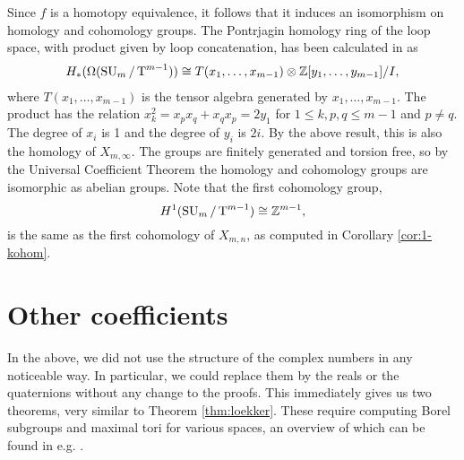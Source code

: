 Since $f$ is a homotopy equivalence, it follows that it induces
an isomorphism on homology and cohomology groups. The Pontrjagin
homology ring of the loop space, with product given by loop
concatenation, has been calculated in \cite[Theorem~4.1]{grbic} as
\begin{align*}
  H_*(\Omega(\operatorname{SU}_{m}/\operatorname{T}^{m-1})) \cong T(x_1,\dots,x_{m-1}) \otimes
  \mathbb{Z}[y_1,\dots,y_{m-1}]/I,
\end{align*}
where $T(x_1,\dots,x_{m-1})$ is the tensor algebra generated by
$x_1,\dots,x_{m-1}$. The product has the relation $x_k^2 =
x_px_q+x_qx_p = 2y_1$ for $1\leq k,p,q\leq m-1$ and $p\neq q$. The
degree of $x_i$ is 1 and the degree of $y_i$
is $2i$. By the above result, this is also the homology of
$X_{m,\infty}$. The groups are finitely generated and torsion free, so
by the Universal Coefficient Theorem the homology and cohomology
groups are isomorphic as abelian groups. Note that the first
cohomology group, 
\[ H^1(\operatorname{SU}_{m}/\operatorname{T}^{m-1}) \cong \mathbb{Z}^{m-1}, \] 
is the same as the first cohomology of $X_{m,n}$, as
computed in Corollary \ref{cor:1-kohom}.

\section{Other coefficients}
\label{sec:coef}

In the above, we did not use the structure of the complex numbers in
any noticeable way. In particular, we could replace them by the reals
or the quaternions without any change to the proofs. This immediately
gives us two theorems, very similar to Theorem
\ref{thm:loekker}. These require computing Borel subgroups and maximal
tori for various spaces, an overview of which can be found in
e.g. \cite[Example 6.7]{malle}.


